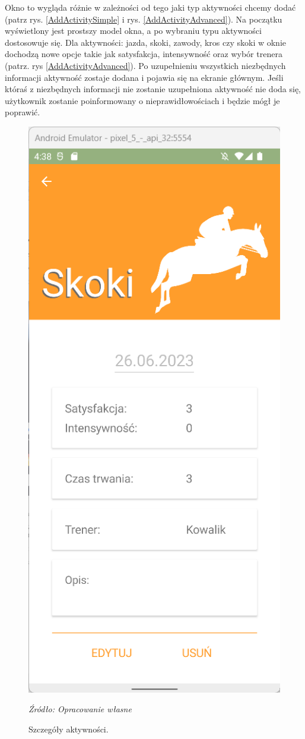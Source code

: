 \documentclass[12pt,oneside]{report}
\begin{document}
Okno to wygląda różnie w zależności od tego jaki typ aktywności chcemy dodać (patrz rys. \ref{AddActivitySimple} i rys. \ref{AddActivityAdvanced}). Na początku wyświetlony jest prostszy model okna, a po wybraniu typu aktywności dostosowuje się. Dla aktywności: jazda, skoki, zawody, kros czy skoki w oknie dochodzą nowe opcje takie jak satysfakcja, intensywność oraz wybór trenera (patrz. rys \ref{AddActivityAdvanced}). Po uzupełnieniu wszystkich niezbędnych informacji aktywność zostaje dodana i pojawia się na ekranie głównym. Jeśli któraś z niezbędnych informacji nie zostanie uzupełniona aktywność nie doda się, użytkownik zostanie poinformowany o nieprawidłowościach i będzie mógł je poprawić.
\begin{figure}
	\centering
	\includegraphics[scale=0.7]{ActivityDetailsView}
	\caption{\centering Szczegóły aktywności.}
	\textit{Źródło: Opracowanie własne}
	\label{ActivityDetails}
\end{figure}
\end{document}
